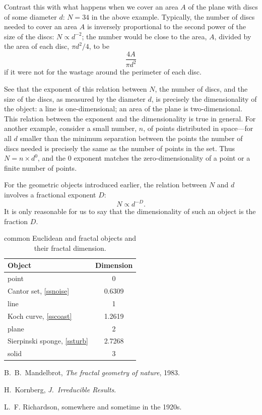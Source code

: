\documentclass[12pt]{article}
\begin{document}
\newpage

Contrast this with what happens when we cover an area $A$ of the 
plane with discs of some diameter $d$:
\(
	N=34
\)
 in the above example.  Typically, 
the number of discs needed to cover an area 
\(
	A
\)
is inversely proportional to the second power of the size of the 
discs: $N\propto d^{-2}$; the number would be close to the area, 
$A$, divided by the area of each disc, $\pi d^2/4$, to be  
\[
	\frac{4A}{\pi d^2}
\]
if it were not for the wastage around the perimeter of 
each disc.

\newpage

See that the exponent of this relation between $N$, the number of 
discs, and the size of the discs, as measured by the diameter $d$, 
is precisely the dimensionality of the object: a line is 
one-dimensional; an area of the plane is two-dimensional.  This 
relation between the exponent and the dimensionality is true in 
general.  For another example, consider a small number, $n$, of 
points distributed in space---for all
\(
	d
\)
smaller than the minimum separation between the points the number of 
discs needed is precisely the same as the number of points in the set.  
Thus $N=n\times d^0$, and the 0 exponent matches the 
zero-dimensionality of a point or a finite number of points.

\newpage

For the geometric objects introduced earlier, the relation between $
N$ and $d$ involves a fractional exponent $D$:
\begin{equation}
	N\propto d^{-D}.
	\label{eqf}
\end{equation}
It is only reasonable for us to say that the 
dimensionality of such an object is the fraction $D$.
\begin{table}
	\caption{common Euclidean and fractal objects and their fractal 
	dimension.}
	\label{T:dimens}
	\begin{center}
        \begin{tabular}{lc}
            \hline
            Object & Dimension  \\
            \hline
            point & 0  \\
            Cantor set, \cref{ssnoise} & 0.6309  \\
            line & 1  \\
            Koch curve, \cref{sscoast} & 1.2619  \\
            plane & 2  \\
            Sierpinski sponge, \cref{ssturb} & 2.7268  \\
            solid & 3  \\
            \hline
        \end{tabular}
	\end{center}
\end{table}

\begin{thebibliography}{99}
	  B.~B.~Mandelbrot, \emph{The fractal geometry of 
	nature}, 1983.

	  H.~Kornberg, \emph{J.\ Irreducible Results}.

	 L.~F. Richardson, somewhere and sometime in the 
	1920s.
\end{thebibliography}
\end{document}
